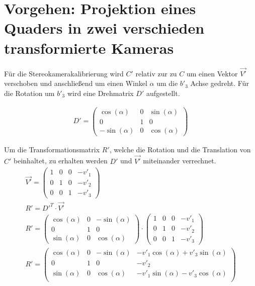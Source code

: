 \section{Vorgehen: Projektion eines Quaders in zwei verschieden transformierte Kameras}


Für die Stereokamerakalibrierung wird $C'$ relativ zur zu $C$ um einen Vektor \ensuremath{\vec{V'}} verschoben und anschließend um einen Winkel \ensuremath{\alpha} um die $b'_3$ Achse gedreht. Für die Rotation um \ensuremath{b'_3} wird eine Drehmatrix $D'$ aufgestellt.

\begin{gather}		
D'= 
\begin{pmatrix}
\cos(\alpha)&0&\sin(\alpha)\\
0&1&0\\
-\sin(\alpha)&0&\cos(\alpha)
\end{pmatrix}
\end{gather}

Um die Transformationsmatrix \ensuremath{R'}, welche die Rotation und die Translation von $C'$ beinhaltet, zu erhalten werden \ensuremath{D'} und \ensuremath{\vec{V'}} miteinander verrechnet.
\begin{gather}
\vec{V'}= 
\begin{pmatrix}
1&0&0&-v'_1\\
0&1&0&-v'_2\\
0&0&1&-v'_3			
\end{pmatrix}\\
R'=D'^T\cdot \vec{V'}\\
R'=		\begin{pmatrix}
\cos(\alpha)&0&-\sin(\alpha)\\
0&1&0\\
\sin(\alpha)&0&\cos(\alpha)
\end{pmatrix} 
\cdot
\begin{pmatrix}
1&0&0&-v'_1\\
0&1&0&-v'_2\\
0&0&1&-v'_3			
\end{pmatrix}\\
R'=
\begin{pmatrix}
\cos(\alpha)&0&-\sin(\alpha)&-v'_1\cos(\alpha)+v'_3\sin(\alpha)\\
0&1&0&-v'_2\\
\sin(\alpha)&0&\cos(\alpha)&-v'_1\sin(\alpha)-v'_3\cos(\alpha)\\
\end{pmatrix}
\end{gather}\\

